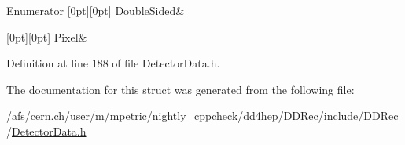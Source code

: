 \begin{DoxyEnumFields}{Enumerator}
[0pt][0pt]{}\hypertarget{struct_d_d4hep_1_1_d_d_rec_1_1_z_disk_petals_struct_1_1_sensor_type_a7adf005f92ce26633f914a97d759d32dad987a4969ad80712a640e43136b96578}{}\label{struct_d_d4hep_1_1_d_d_rec_1_1_z_disk_petals_struct_1_1_sensor_type_a7adf005f92ce26633f914a97d759d32dad987a4969ad80712a640e43136b96578} 
Double\+Sided&\\
\hline

[0pt][0pt]{}\hypertarget{struct_d_d4hep_1_1_d_d_rec_1_1_z_disk_petals_struct_1_1_sensor_type_a7adf005f92ce26633f914a97d759d32da73fc4b655f1930a5283de453c1dc406f}{}\label{struct_d_d4hep_1_1_d_d_rec_1_1_z_disk_petals_struct_1_1_sensor_type_a7adf005f92ce26633f914a97d759d32da73fc4b655f1930a5283de453c1dc406f} 
Pixel&\\
\hline

\end{DoxyEnumFields}


Definition at line 188 of file Detector\+Data.\+h.



The documentation for this struct was generated from the following file\+:\begin{DoxyCompactItemize}
\item 
/afs/cern.\+ch/user/m/mpetric/nightly\+\_\+cppcheck/dd4hep/\+D\+D\+Rec/include/\+D\+D\+Rec/\hyperlink{_detector_data_8h}{Detector\+Data.\+h}\end{DoxyCompactItemize}
